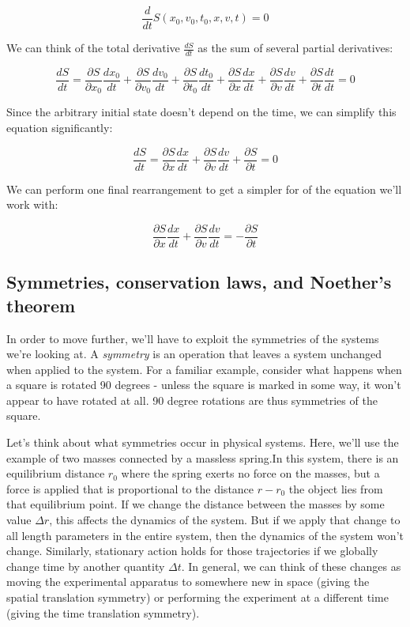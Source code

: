 $$\frac{d}{dt}S\left(x_0, v_0, t_0, x, v, t\right) = 0$$

We can think of the total derivative $\frac{dS}{dt}$ as the sum of several partial derivatives:

$$
\frac{dS}{dt} = 
\frac{\partial S}{\partial x_0} \frac{dx_0}{dt} + 
\frac{\partial S}{\partial v_0} \frac{dv_0}{dt} + 
\frac{\partial S}{\partial t_0} \frac{dt_0}{dt} + 
\frac{\partial S}{\partial x} \frac{dx}{dt} + 
\frac{\partial S}{\partial v} \frac{dv}{dt} + 
\frac{\partial S}{\partial t} \frac{dt}{dt} = 0
$$

Since the arbitrary initial state doesn't depend on the time, we can simplify this equation
significantly:

$$
\frac{dS}{dt} = 
\frac{\partial S}{\partial x} \frac{dx}{dt} + 
\frac{\partial S}{\partial v} \frac{dv}{dt} + 
\frac{\partial S}{\partial t} = 0
$$

We can perform one final rearrangement to get a simpler for of the equation we'll work with:

$$
\frac{\partial S}{\partial x} \frac{dx}{dt} + 
\frac{\partial S}{\partial v} \frac{dv}{dt} =
-\frac{\partial S}{\partial t}
$$

\subsection{Symmetries, conservation laws, and Noether's theorem}

In order to move further, we'll have to exploit the symmetries of the systems we're looking at. A
\textit{symmetry} is an operation that leaves a system unchanged when applied to the system. For a
familiar example, consider what happens when a square is rotated 90 degrees - unless the square is
marked in some way, it won't appear to have rotated at all. 90 degree rotations are thus symmetries
of the square.

Let's think about what symmetries occur in physical systems. Here, we'll use the example of two
masses connected by a massless spring.In this system, there is an equilibrium distance $r_0$ where
the spring exerts no force on the masses, but a force is applied that is proportional to the
distance $r - r_0$ the object lies from that equilibrium point. If we change the distance between
the masses by some value  $\Delta r$, this affects the dynamics of the system. But if we apply that
change to all length parameters in the entire system, then the dynamics of the system won't change.
Similarly, stationary action holds for those trajectories if we globally change time by another
quantity $\Delta t$. In general, we can think of these changes as moving the experimental apparatus
to somewhere new in space (giving the spatial translation symmetry) or performing the experiment at
a different time (giving the time translation symmetry). 

